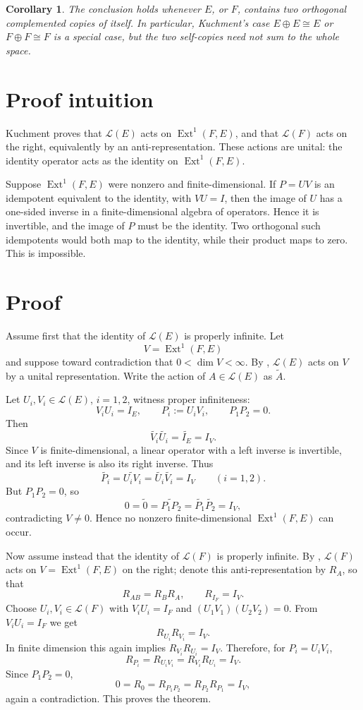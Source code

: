 \documentclass[11pt]{article}
\newtheorem{corollary}{Corollary}
\newcommand{\Ext}{\operatorname{Ext}^1}
\newcommand{\cL}{\mathcal L}
\begin{document}
\begin{corollary}
The conclusion holds whenever \(E\), or \(F\), contains two orthogonal
complemented copies of itself. In particular, Kuchment's case
\(E\oplus E\cong E\) or \(F\oplus F\cong F\) is a special case, but the two
self-copies need not sum to the whole space.
\end{corollary}

\section*{Proof intuition}

Kuchment proves that \(\cL(E)\) acts on \(\Ext(F,E)\), and that \(\cL(F)\)
acts on the right, equivalently by an anti-representation. These actions are
unital: the identity operator acts as the identity on \(\Ext(F,E)\).

Suppose \(\Ext(F,E)\) were nonzero and finite-dimensional. If
\(P=UV\) is an idempotent equivalent to the identity, with \(VU=I\), then the
image of \(U\) has a one-sided inverse in a finite-dimensional algebra of
operators. Hence it is invertible, and the image of \(P\) must be the identity.
Two orthogonal such idempotents would both map to the identity, while their
product maps to zero. This is impossible.

\section*{Proof}

Assume first that the identity of \(\cL(E)\) is properly infinite. Let
\[
V=\Ext(F,E)
\]
and suppose toward contradiction that \(0<\dim V<\infty\). By
\cite[Theorem 1.8]{Kuchment}, \(\cL(E)\) acts on \(V\) by a unital
representation. Write the action of \(A\in\cL(E)\) as \(\widetilde A\).

Let \(U_i,V_i\in\cL(E)\), \(i=1,2\), witness proper infiniteness:
\[
 V_iU_i=I_E,\qquad P_i:=U_iV_i,\qquad P_1P_2=0.
\]
Then
\[
 \widetilde{V_i}\widetilde{U_i}=\widetilde{I_E}=I_V.
\]
Since \(V\) is finite-dimensional, a linear operator with a left inverse is
invertible, and its left inverse is also its right inverse. Thus
\[
 \widetilde{P_i}
 =\widetilde{U_iV_i}
 =\widetilde{U_i}\widetilde{V_i}
 =I_V
 \qquad (i=1,2).
\]
But \(P_1P_2=0\), so
\[
 0=\widetilde{0}
 =\widetilde{P_1P_2}
 =\widetilde{P_1}\widetilde{P_2}
 =I_V,
\]
contradicting \(V\ne0\). Hence no nonzero finite-dimensional \(\Ext(F,E)\)
can occur.

Now assume instead that the identity of \(\cL(F)\) is properly infinite. By
\cite[Theorem 1.8]{Kuchment}, \(\cL(F)\) acts on \(V=\Ext(F,E)\) on the
right; denote this anti-representation by \(R_A\), so that
\[
 R_{AB}=R_B R_A,\qquad R_{I_F}=I_V.
\]
Choose \(U_i,V_i\in\cL(F)\) with \(V_iU_i=I_F\) and
\((U_1V_1)(U_2V_2)=0\). From \(V_iU_i=I_F\) we get
\[
 R_{U_i}R_{V_i}=I_V.
\]
In finite dimension this again implies \(R_{V_i}R_{U_i}=I_V\). Therefore, for
\(P_i=U_iV_i\),
\[
 R_{P_i}=R_{U_iV_i}=R_{V_i}R_{U_i}=I_V.
\]
Since \(P_1P_2=0\),
\[
 0=R_0=R_{P_1P_2}=R_{P_2}R_{P_1}=I_V,
\]
again a contradiction. This proves the theorem.
\end{document}
